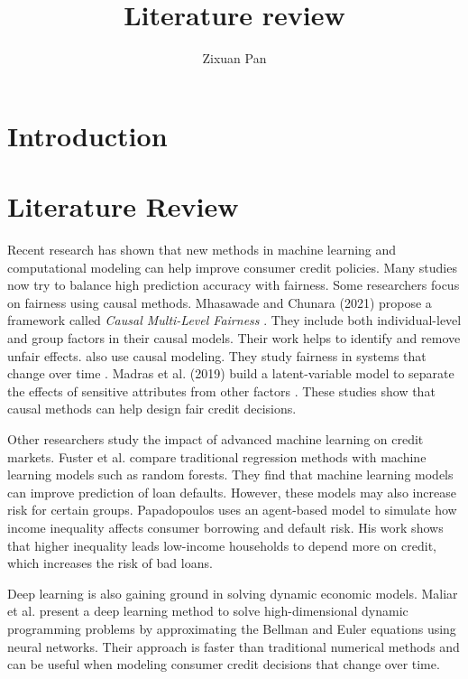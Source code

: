\documentclass[acmsmall]{acmart}
\title{Literature review}
\author{Zixuan Pan}
\begin{document}
\maketitle

\section{Introduction}

\section{Literature Review}
Recent research has shown that new methods in machine learning and computational modeling can help improve consumer credit policies. Many studies now try to balance high prediction accuracy with fairness. Some researchers focus on fairness using causal methods. Mhasawade and Chunara (2021) propose a framework called \emph{Causal Multi-Level Fairness} \cite{mhasawade2021causalmultilevelfairness}. They include both individual-level and group factors in their causal models. Their work helps to identify and remove unfair effects. \citet{creager2020causalmodelingfairnessdynamical} also use causal modeling. They study fairness in systems that change over time . Madras et al. (2019) build a latent-variable model to separate the effects of sensitive attributes from other factors \cite{10.1145/3287560.3287564}. These studies show that causal methods can help design fair credit decisions.

Other researchers study the impact of advanced machine learning on credit markets. Fuster et al. \cite{https://doi.org/10.1111/jofi.13090} compare traditional regression methods with machine learning models such as random forests. They find that machine learning models can improve prediction of loan defaults. However, these models may also increase risk for certain groups. Papadopoulos \cite{PAPADOPOULOS201939} uses an agent-based model to simulate how income inequality affects consumer borrowing and default risk. His work shows that higher inequality leads low-income households to depend more on credit, which increases the risk of bad loans.

Deep learning is also gaining ground in solving dynamic economic models. Maliar et al. \cite{MALIAR202176} present a deep learning method to solve high-dimensional dynamic programming problems by approximating the Bellman and Euler equations using neural networks. Their approach is faster than traditional numerical methods and can be useful when modeling consumer credit decisions that change over time.
\end{document}
